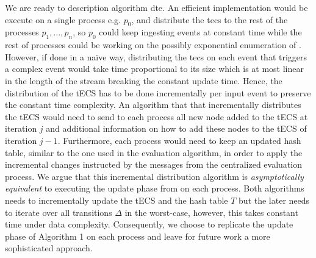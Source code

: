 We are ready to description algorithm \acrshort{dte}. An efficient implementation would be execute \cite[Algorithm 1]{core} on a single process e.g. $p_{0}$, and distribute the \acrshort{tecs} \tecs to the rest of the processes $p_{1}, \ldots, p_{n}$, so $p_{0}$ could keep ingesting events at constant time while the rest of processes could be working on the possibly exponential enumeration of \tecs. However, if done in a na\"ive way, distributing the \acrshort{tecs} on each event that triggers a complex event would take time proportional to its size which is at most linear in the length of the stream breaking the constant update time. Hence, the distribution of the tECS has to be done incrementally per input event to preserve the constant time complexity. An algorithm that that incrementally distributes the tECS would need to send to each process all new node added to the tECS at iteration $j$ and additional information on how to add these nodes to the tECS of iteration $j-1$. Furthermore, each process would need to keep an updated hash table, similar to the one used in the evaluation algorithm, in order to apply the incremental changes instructed by the messages from the centralized evaluation process. We argue that this incremental distribution algorithm is \emph{asymptotically equivalent} to executing the update phase from \cite[Algorithm 1]{core} on each process. Both algorithms needs to incrementally update the tECS and the hash table $T$ but the later needs to iterate over all transitions $\Delta$ in the worst-case, however, this takes constant time under data complexity. Consequently, we choose to replicate the update phase of Algorithm 1 on each process and leave for future work a more sophisticated approach.





